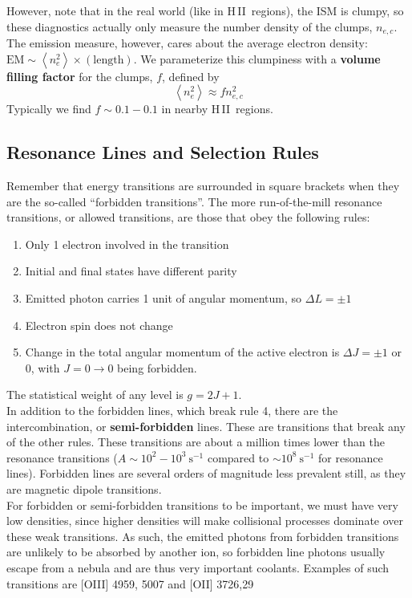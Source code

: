 \documentclass[10pt]{article}
\numberwithin{equation}{section}
\newcommand{\n}{\noindent}
\newcommand{\avg}[1]{\left\langle#1\right\rangle}
\newcommand{\HII}{H\,II\ }
\begin{document}
\n However, note that in the real world (like in \HII regions), the ISM is
clumpy, so these diagnostics actually only measure the number density of the
clumps, $n_{e,c}$. The emission measure, however, cares about the average
electron density: $\mathrm{EM}\sim \avg{n_e^2}\times(\mathrm{length})$. We
parameterize this clumpiness with a \textbf{volume filling factor} for the
clumps, $f$, defined by
\begin{equation}
  \label{eq:ff:1} \avg{n_e^2}\approx fn_{e,c}^2
\end{equation}
Typically we find $f\sim 0.1-0.1$ in nearby \HII regions.
\subsection{Resonance Lines and Selection Rules} %
\label{sub:resonance_lines_and_selection_rules}
Remember that energy transitions are surrounded in square brackets when they are the so-called ``forbidden transitions''. The more run-of-the-mill resonance transitions, or allowed transitions, are those that obey the following rules:
\begin{enumerate}
  \item Only 1 electron involved in the transition
  \item Initial and final states have different parity
  \item Emitted photon carries 1 unit of angular momentum, so $\Delta L = \pm 1$
  \item Electron spin does not change
  \item Change in the total angular momentum of the active electron is $\Delta J = \pm 1$ or $0$, with $J=0\to0$ being forbidden.
\end{enumerate}
The statistical weight of any level is $g=2J + 1$.\\

\n In addition to the forbidden lines, which break rule 4, there are the intercombination, or \textbf{semi-forbidden} lines. These are transitions that break any of the other rules. These transitions are about a million times lower than the resonance transitions ($A\sim 10^2-10^3\ \mathrm{s^{-1}}$ compared to $\sim10^8\ \mathrm{s^{-1}}$ for resonance lines). Forbidden lines are several orders of magnitude less prevalent still, as they are magnetic dipole transitions.\\

\n For forbidden or semi-forbidden transitions to be important, we must have very low densities, since higher densities will make collisional processes dominate over these weak transitions. As such, the emitted photons from forbidden transitions are unlikely to be absorbed by another ion, so forbidden line photons usually escape from a nebula and are thus very important coolants. Examples of such transitions are [OIII] 4959, 5007 and [OII] 3726,29
\end{document}

